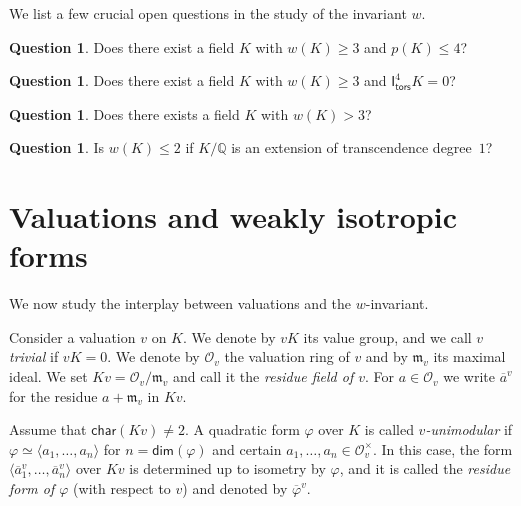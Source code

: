 \documentclass[twoside,11pt]{amsart}
\numberwithin{equation}{section}
\theoremstyle{definition}
\newtheorem{qu}[equation]{Question}
\renewcommand{\dim}{\operatorname{\mathsf{dim}}}
\newcommand{\car}{\mathsf{char}}
\newcommand{\vf}{\varphi}
\newcommand{\mg}[1]{{#1}^{\times}}
\newcommand{\la}{\langle}
\newcommand{\ra}{\rangle}
\renewcommand{\leq}{\leqslant}
\renewcommand{\geq}{\geqslant}
\newcommand{\tors}{\mathsf{tors}}
\newcommand{\I}{\mathsf{I}}
\newcommand{\mc}{\mathcal}
\newcommand{\ovl}{\overline}
\renewcommand{\dim}{\mathsf{dim}}
\renewcommand{\leq}{\leqslant}
\renewcommand{\geq}{\geqslant}
\newcommand{\mf}{\mathfrak}
\newcommand{\mfm}{\mf{m}}
\newcommand{\qq}{\mathbb{Q}}
\begin{document}
We list a few crucial open questions in the study of the invariant $w$.

\begin{qu}
    Does there exist a field $K$ with $w(K)\geq 3$ and $p(K)\leq 4$?
\end{qu}
\begin{qu}
    Does there exist a field $K$ with $w(K)\geq 3$ and $\I^4_\tors K=0$?
\end{qu}

\begin{qu}
Does there exists a field $K$ with $w(K)>3$?    
\end{qu}

\begin{qu}
    Is $w(K)\leq 2$ if $K/\qq$ is an extension of transcendence degree~$1$?
\end{qu}



\section{Valuations and weakly isotropic forms}

We now study the interplay between valuations and the $w$-invariant.



Consider a valuation $v$ on $K$.
We denote by $vK$ its value group, and we call $v$ \emph{trivial} if $vK=0$.
We denote by $\mc{O}_v$ the valuation ring of $v$ and by $\mfm_v$ its maximal ideal.
We set $Kv=\mc{O}_v/\mfm_v$ and call it the \emph{residue field of $v$}.
For $a\in\mc{O}_v$ we write $\ovl{a}^v$ for the residue $a+\mfm_v$ in $Kv$.

Assume that $\car(Kv)\neq 2$. A quadratic form $\vf$ over $K$ is called \emph{$v$-unimodular} if $\vf\simeq \la a_1,\dots,a_n\ra$ for $n=\dim(\vf)$ and certain $a_1,\dots,a_n\in\mg{\mc{O}}_v$.
In this case, the form $\la \ovl{a}^v_1,\dots,\ovl{a}_n^v\ra$ over $Kv$ is determined up to isometry by $\vf$, and it is called the \emph{residue form of $\vf$} (with respect to $v$) and denoted by $\ovl{\vf}^v$.
\end{document}
